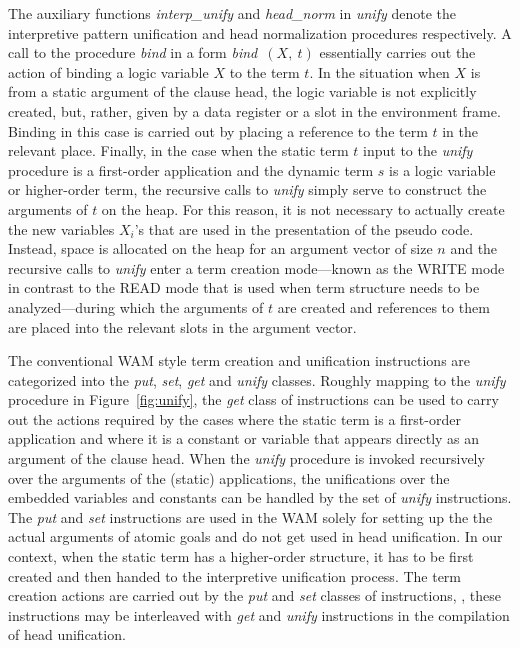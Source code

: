 The auxiliary functions {\it interp\_unify}
and {\it head\_norm} in {\it unify} denote the interpretive
pattern unification and head normalization procedures respectively.
A call to the procedure {\it bind} in a form {\it bind\ $(X,\ t)$}
essentially carries out the action of binding a logic variable $X$ to the
term $t$.
In the situation when $X$ is from a static argument of the clause head,
the logic variable is not explicitly created, but, rather, given by a
data register or a slot in the environment frame.
Binding in this case is carried out by placing a reference to the term
$t$ in the relevant place.
Finally, in the case when the static term $t$ input to the {\it unify}
procedure is a first-order application and the dynamic term $s$ is a logic
variable or higher-order term, the recursive calls to {\it unify} simply
serve to construct the arguments of $t$ on the heap. For this reason, it is
not necessary to actually create the new variables $X_i$'s that are used
in the presentation of the pseudo code. Instead, space is allocated on
the heap for an argument vector of size $n$ and the recursive calls to
{\it unify} enter a term creation mode---known as the WRITE mode in
contrast to the READ mode that is used when term structure needs to be
analyzed---during which the arguments of $t$ are
created and references to them are placed into the relevant slots in the
argument vector.

The conventional WAM style term creation and unification instructions
are categorized into the {\it put}, {\it set}, {\it get}
and {\it unify} classes. Roughly mapping to the {\it unify} procedure in
Figure~\ref{fig:unify}, the {\it get} class of instructions can be used to
carry out the actions required by the cases where the static term is a
first-order application and where it is a constant or variable that appears
directly as an argument of the clause head.
When the {\it unify} procedure is invoked recursively over the
arguments of the (static) applications, the unifications over the embedded
variables and constants can be handled by the set of {\it unify} instructions.
The {\it put} and {\it set} instructions are used in the WAM solely for
setting up the the actual arguments of atomic goals and do not get used
in head unification. In our context, when the static
term has a higher-order structure, it has to be first
created and then handed to the interpretive unification process.
The term creation actions are carried out by
the {\it put} and {\it set} classes of instructions, \ie, these
instructions may be interleaved with {\it get} and {\it unify}
instructions in the compilation of head unification.

